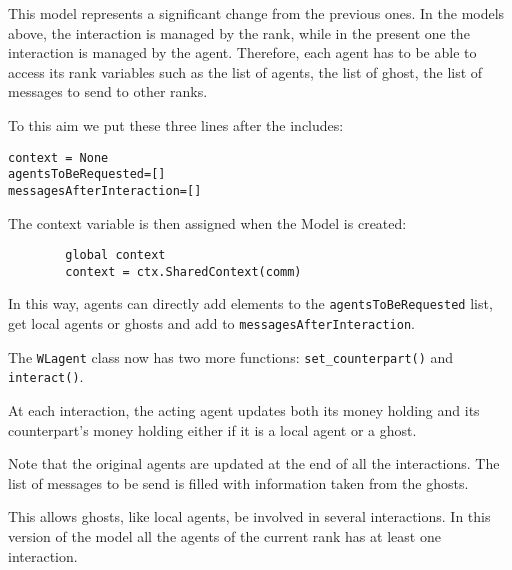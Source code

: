 \documentclass{article}
\begin{document}
This model represents a significant change from the previous ones. In the models above, the interaction is managed by the rank, while in the present one the interaction is managed by the agent.  
Therefore, each agent has to be able to access its rank variables such as the list of agents, the list of ghost, the list of messages to send to other ranks. 

To this aim we put these three lines after the includes:
\begin{verbatim}
context = None
agentsToBeRequested=[]
messagesAfterInteraction=[]
\end{verbatim}
The context variable is then assigned when the Model is created:
\begin{verbatim}
        global context
        context = ctx.SharedContext(comm)
\end{verbatim}
In this way, agents can directly add elements to the \verb+agentsToBeRequested+ list, get local agents or ghosts and add to \verb+messagesAfterInteraction+.

The \verb+WLagent+ class now has two more functions: \verb+set_counterpart()+ and \verb+interact()+. 

At each interaction, the acting agent updates both its money holding and its counterpart's money holding either if it is a local agent or a ghost.

Note that the original agents are updated at the end of all the interactions. The list of messages to be send is filled with information taken from the ghosts.

This allows ghosts, like local agents, be involved in several interactions. In this version of the model all the agents of the current rank has at least one interaction.
\end{document}
